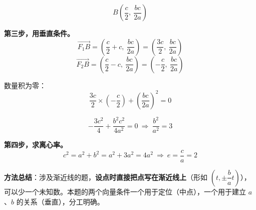 \begin{answer}
\nopagebreak[4]
\[B\left(\frac c2,\ \frac{bc}{2a}\right)\]

\textbf{第三步，用垂直条件。}
\nopagebreak[4]
\[\overrightarrow{F_1B}=\left(\frac c2+c,\ \frac{bc}{2a}\right)=\left(\frac{3c}2,\ \frac{bc}{2a}\right)\]
\nopagebreak[4]
\[\overrightarrow{F_2B}=\left(\frac c2-c,\ \frac{bc}{2a}\right)=\left(-\frac c2,\ \frac{bc}{2a}\right)\]

数量积为零：
\nopagebreak[4]
\[\frac{3c}2\times\left(-\frac c2\right)+\left(\frac{bc}{2a}\right)^{2}=0\]

\nopagebreak[4]
\[-\frac{3c^{2}}4+\frac{b^{2}c^{2}}{4a^{2}}=0\ \Longrightarrow\ \frac{b^{2}}{a^{2}}=3\]

\textbf{第四步，求离心率。}
\nopagebreak[4]
\[c^{2}=a^{2}+b^{2}=a^{2}+3a^{2}=4a^{2}\ \Longrightarrow\ e=\frac ca=2\]

\begin{gktip}
\textbf{方法总结}：涉及渐近线的题，\textbf{设点时直接把点写在渐近线上}（形如 $\left(t,\pm\dfrac ba t\right)$），可以少一个未知数。本题的两个向量条件一个用于定位（中点），一个用于建立 $a$、$b$ 的关系（垂直），分工明确。
\end{gktip}


\par\medskip

\end{answer}

